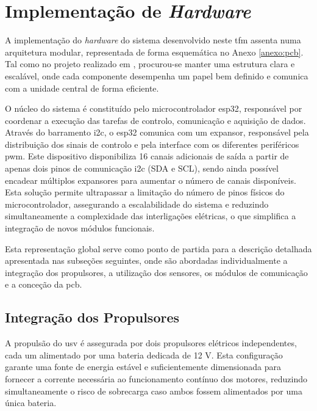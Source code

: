 \section{Implementação de \emph{Hardware}}
\label{sec:implementacao-hardware}

A implementação do \emph{hardware} do sistema desenvolvido neste \gls{tfm} assenta numa arquitetura modular, representada de forma esquemática no Anexo \ref{anexo:pcb}. Tal como no projeto realizado em \cite{didactic-robot-thesis}, procurou-se manter uma estrutura clara e escalável, onde cada componente desempenha um papel bem definido e comunica com a unidade central de forma eficiente.  

O núcleo do sistema é constituído pelo microcontrolador \gls{esp32}, responsável por coordenar a execução das tarefas de controlo, comunicação e aquisição de dados. Através do barramento \gls{i2c}, o \gls{esp32} comunica com um expansor, responsável pela distribuição dos sinais de controlo e pela interface com os diferentes periféricos \gls{pwm}. Este dispositivo disponibiliza 16 canais adicionais de saída a partir de apenas dois pinos de comunicação \gls{i2c} (SDA e SCL), sendo ainda possível encadear múltiplos expansores para aumentar o número de canais disponíveis. Esta solução permite ultrapassar a limitação do número de pinos físicos do microcontrolador, assegurando a escalabilidade do sistema e reduzindo simultaneamente a complexidade das interligações elétricas, o que simplifica a integração de novos módulos funcionais.

Esta representação global serve como ponto de partida para a descrição detalhada apresentada nas subseções seguintes, onde são abordadas individualmente a integração dos propulsores, a utilização dos sensores, os módulos de comunicação e a conceção da \gls{pcb}.

\subsection{Integração dos Propulsores}
\label{subsec:integracao-propulsores}

A propulsão do \gls{usv} é assegurada por dois propulsores elétricos independentes, cada um alimentado por uma bateria dedicada de 12 V. Esta configuração garante uma fonte de energia estável e suficientemente dimensionada para fornecer a corrente necessária ao funcionamento contínuo dos motores, reduzindo simultaneamente o risco de sobrecarga caso ambos fossem alimentados por uma única bateria.  

